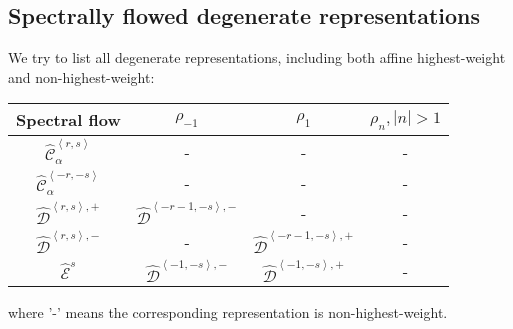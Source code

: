 \documentclass[10pt,a4paper]{article}
\numberwithin{equation}{section}
\newcommand{\vev}[1]{\left\langle #1 \right\rangle}
\begin{document}
\subsection{Spectrally flowed degenerate representations}
We try to list all degenerate representations, including both affine highest-weight and non-highest-weight:

\begin{center}
    \begin{tabular}{|c|c|c|c|}
        \hline
        Spectral flow &$\rho_{-1}$&$\rho_{1}$&$\rho_{n}, |n|>1$\\
        \hline
        $\hat{\mathcal{C}}^{\vev{r,s}}_{\alpha} $ & - & - & -\\
        \hline
        $\hat{\mathcal{C}}^{\vev{-r,-s}}_{\alpha} $ & - & - & -\\
        \hline
        $\hat{\mathcal{D}}^{\vev{r,s},+} $ & $\hat{\mathcal{D}}^{\vev{-r-1,-s},-} $ & - & -\\
        \hline
        $\hat{\mathcal{D}}^{\vev{r,s},-} $ &- & $\hat{\mathcal{D}}^{\vev{-r-1,-s},+} $ & - \\
        \hline
        $\hat{\mathcal{E}}^{s} $& $\hat{\mathcal{D}}^{\vev{-1,-s},-} $ & $\hat{\mathcal{D}}^{\vev{-1,-s},+} $& -\\
        \hline
    \end{tabular}
\end{center}
where '-' means the corresponding representation is non-highest-weight.


\printbibliography 
\end{document}
